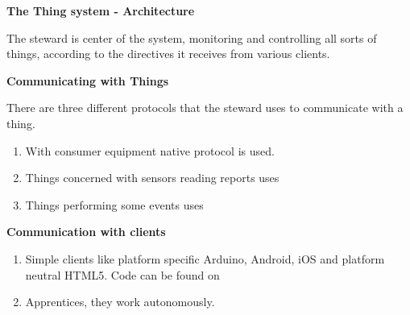 \documentclass[16pt]{article}
\begin{document}
\begin{itemize}

{\Large{\item{\textbf{The Thing system - Architecture}}}}


\vspace{0.5cm}

The steward is center of the system, monitoring and controlling all
sorts of things, according to the directives it receives from various
clients.
\vspace{0.5cm}

{\Large{\textbf{Communicating with
Things}}}


There are three different protocols that the steward uses to communicate
with a thing. 

\begin{enumerate}


\item With consumer equipment native protocol is used.
\item Things concerned with sensors reading reports uses
\item Things performing some events uses

\end{enumerate}

\vspace{0.5cm}

{\Large{\textbf{Communication with
clients}}}


\begin{enumerate}


\item
  Simple clients like platform specific Arduino, Android, iOS and
  platform neutral HTML5. Code can be found on
\item
  Apprentices, they work autonomously.
  

\end{enumerate}
\end{itemize}
\end{document}
